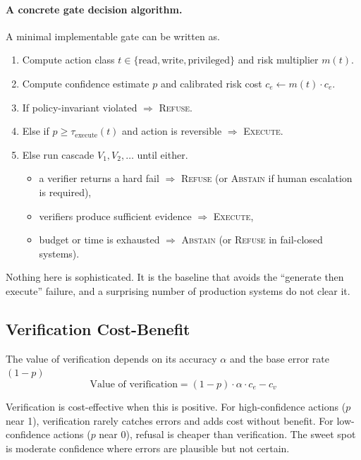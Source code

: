 \paragraph{A concrete gate decision algorithm.}
A minimal implementable gate can be written as.
\begin{enumerate}
\item Compute action class $t \in \{\text{read}, \text{write}, \text{privileged}\}$ and risk multiplier $m(t)$.
\item Compute confidence estimate $p$ and calibrated risk cost $c_e \leftarrow m(t)\cdot c_e$.
\item If policy-invariant violated $\Rightarrow$ \textsc{Refuse}.
\item Else if $p \ge \tau_{\text{execute}}(t)$ and action is reversible $\Rightarrow$ \textsc{Execute}.
\item Else run cascade $V_1, V_2, \ldots$ until either.
  \begin{itemize}
  \item a verifier returns a hard fail $\Rightarrow$ \textsc{Refuse} (or \textsc{Abstain} if human escalation is required),
  \item verifiers produce sufficient evidence $\Rightarrow$ \textsc{Execute},
  \item budget or time is exhausted $\Rightarrow$ \textsc{Abstain} (or \textsc{Refuse} in fail-closed systems).
  \end{itemize}
\end{enumerate}
Nothing here is sophisticated. It is the baseline that avoids the ``generate then execute'' failure, and a surprising number of production systems do not clear it.

\subsection{Verification Cost-Benefit}

The value of verification depends on its accuracy $\alpha$ and the base error rate $(1-p)$
\[
\text{Value of verification} = (1-p) \cdot \alpha \cdot c_e - c_v
\]

Verification is cost-effective when this is positive. For high-confidence actions ($p$ near 1), verification rarely catches errors and adds cost without benefit. For low-confidence actions ($p$ near 0), refusal is cheaper than verification. The sweet spot is moderate confidence where errors are plausible but not certain.

